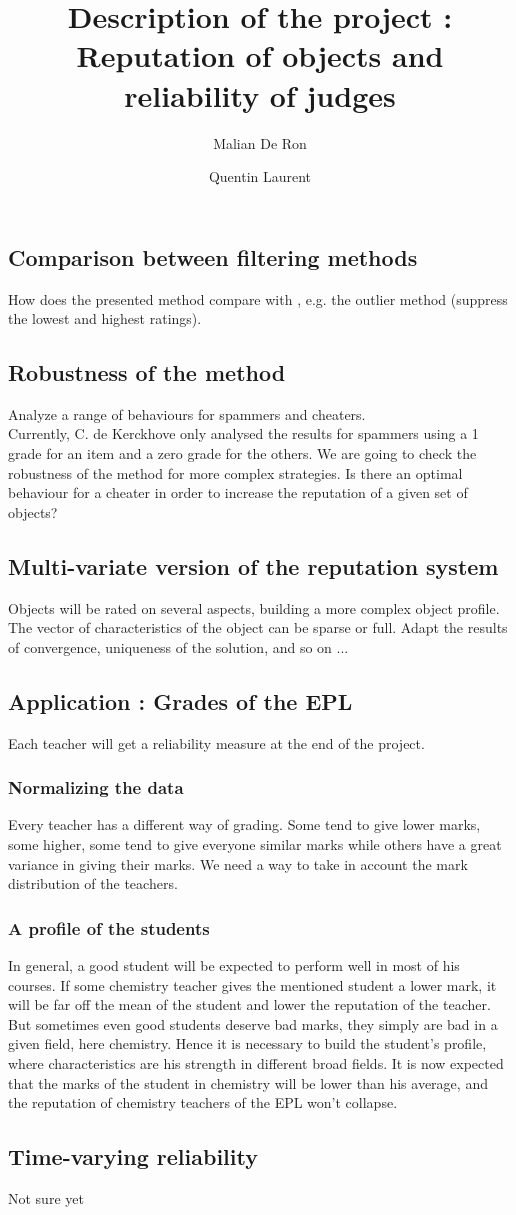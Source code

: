 \documentclass[12pt,a4paper,notitlepage]{article}
\title{Description of the project : Reputation of objects and reliability of judges}
\author{Malian De Ron \and Quentin Laurent}
\begin{document}
\maketitle
\subsection*{Comparison between filtering methods}
How does the presented method compare with , e.g. the outlier method (suppress the lowest and highest ratings).
\subsection*{Robustness of the method}
Analyze a range of behaviours for spammers and cheaters.\\
Currently, C. de Kerckhove only analysed the results for spammers using a 1 grade for an item and a zero grade for the others. We are going to check the robustness of the method for more complex strategies. Is there an optimal behaviour for a cheater in order to increase the reputation of a given set of objects?
\subsection*{Multi-variate version of the reputation system}
Objects will be rated on several aspects, building a more complex object profile. The vector of characteristics of the object can be sparse or full.
Adapt the results of convergence, uniqueness of the solution, and so on ...
\subsection*{Application : Grades of the EPL}
Each teacher will get a reliability measure at the end of the project.
\subsubsection*{Normalizing the data}
Every teacher has a different way of grading. Some tend to give lower marks, some higher, some tend to give everyone similar marks while others have a great variance in giving their marks. We need a way to take in account the mark distribution of the teachers.
\subsubsection*{A profile of the students}
In general, a good student will be expected to perform well in most of his courses. If some chemistry teacher gives the mentioned student a lower mark, it will be far off the mean of the student and lower the reputation of the teacher.\\
But sometimes even good students deserve bad marks, they simply are bad in a given field, here chemistry. Hence it is necessary to build the student's profile, where characteristics are his strength in different broad fields. It is now expected that the marks of the student in chemistry will be lower than his average, and the reputation of chemistry teachers of the EPL won't collapse.

\subsection*{Time-varying reliability}
Not sure yet
\end{document}
